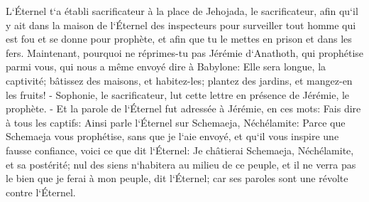 \verse L`Éternel t`a établi sacrificateur à la place de Jehojada, le sacrificateur, afin qu`il y ait dans la maison de l`Éternel des inspecteurs pour surveiller tout homme qui est fou et se donne pour prophète, et afin que tu le mettes en prison et dans les fers. 
\verse Maintenant, pourquoi ne réprimes-tu pas Jérémie d`Anathoth, qui prophétise parmi vous, 
\verse qui nous a même envoyé dire à Babylone: Elle sera longue, la captivité; bâtissez des maisons, et habitez-les; plantez des jardins, et mangez-en les fruits! - 
\verse Sophonie, le sacrificateur, lut cette lettre en présence de Jérémie, le prophète. - 
\verse Et la parole de l`Éternel fut adressée à Jérémie, en ces mots: 
\verse Fais dire à tous les captifs: Ainsi parle l`Éternel sur Schemaeja, Néchélamite: Parce que Schemaeja vous prophétise, sans que je l`aie envoyé, et qu`il vous inspire une fausse confiance, 
\verse voici ce que dit l`Éternel: Je châtierai Schemaeja, Néchélamite, et sa postérité; nul des siens n`habitera au milieu de ce peuple, et il ne verra pas le bien que je ferai à mon peuple, dit l`Éternel; car ses paroles sont une révolte contre l`Éternel. 

